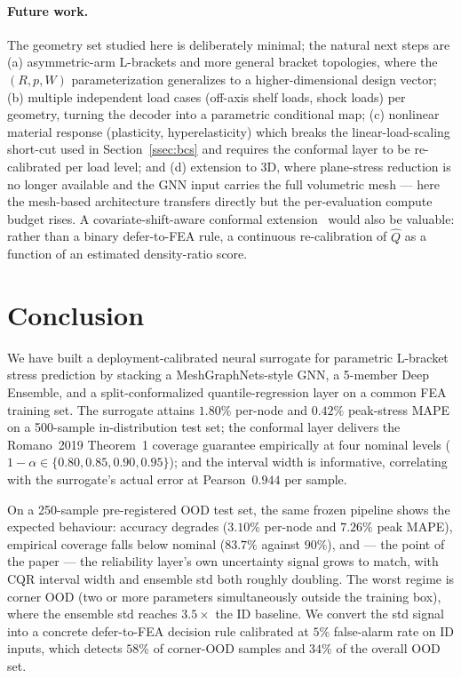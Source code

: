 \documentclass[11pt]{article}
\begin{document}
\paragraph{Future work.}
The geometry set studied here is deliberately minimal; the natural next
steps are (a) asymmetric-arm L-brackets and more general bracket
topologies, where the $(R, p, W)$ parameterization generalizes to a
higher-dimensional design vector; (b) multiple independent load cases
(off-axis shelf loads, shock loads) per geometry, turning the decoder
into a parametric conditional map; (c) nonlinear material response
(plasticity, hyperelasticity) which breaks the linear-load-scaling short-cut
used in Section~\ref{ssec:bcs} and requires the conformal layer to be
re-calibrated per load level; and (d) extension to 3D, where plane-stress
reduction is no longer available and the GNN input carries the full
volumetric mesh --- here the mesh-based architecture transfers directly
but the per-evaluation compute budget rises. A covariate-shift-aware
conformal extension~\cite{angelopoulos2023conformal} would also be
valuable: rather than a binary defer-to-FEA rule, a continuous
re-calibration of $\hat{Q}$ as a function of an estimated
density-ratio score.

\section{Conclusion}
\label{sec:conclusion}

We have built a deployment-calibrated neural surrogate for parametric
L-bracket stress prediction by stacking a MeshGraphNets-style GNN, a
5-member Deep Ensemble, and a split-conformalized quantile-regression
layer on a common FEA training set. The surrogate attains $1.80\%$
per-node and $0.42\%$ peak-stress MAPE on a 500-sample in-distribution
test set; the conformal layer delivers the Romano~2019 Theorem~1
coverage guarantee empirically at four nominal levels
($1 - \alpha \in \{0.80, 0.85, 0.90, 0.95\}$); and the interval width is
informative, correlating with the surrogate's actual error at
Pearson~$0.944$ per sample.

On a 250-sample pre-registered OOD test set, the same frozen pipeline
shows the expected behaviour: accuracy degrades
($3.10\%$ per-node and $7.26\%$ peak MAPE), empirical coverage falls
below nominal ($83.7\%$ against $90\%$), and --- the point of the paper
--- the reliability layer's own uncertainty signal grows to match, with
CQR interval width and ensemble std both roughly doubling. The worst
regime is corner OOD (two or more parameters simultaneously outside the
training box), where the ensemble std reaches $3.5\times$ the ID baseline.
We convert the std signal into a concrete defer-to-FEA decision rule
calibrated at $5\%$ false-alarm rate on ID inputs, which detects $58\%$
of corner-OOD samples and $34\%$ of the overall OOD set.
\end{document}
